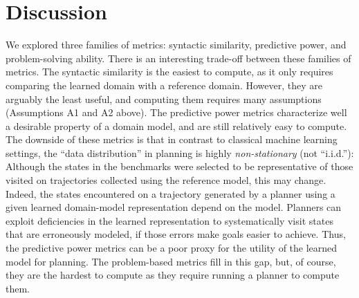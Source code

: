 \documentclass[letterpaper]{article} %
\newif\ifaddcomments
\newcommand{\roni}[1]{\ifaddcomments{\textcolor{red}{[Roni: #1]}}\fi}
\begin{document}
\section{Discussion}
We explored three families of metrics: syntactic similarity, predictive power, and problem-solving ability. 
There is an interesting trade-off between these families of metrics. 
The syntactic similarity is the easiest to compute, as it only requires comparing the learned domain with a reference domain. However, they are arguably the least useful, and computing them requires many assumptions (Assumptions A1 and A2 above). 
The predictive power metrics characterize well a desirable property of a domain model, and are still relatively easy to compute. 
The downside of these metrics is that in contrast to classical machine learning settings, the ``data distribution'' in planning is highly \emph{non-stationary} (not ``i.i.d.''):  Although the states in the benchmarks were selected to be representative of those visited on trajectories collected using the reference model, this may change. Indeed, the states encountered on a trajectory generated by a planner using a given learned domain-model representation depend on the model. Planners can exploit deficiencies in the learned representation to systematically visit states that are erroneously modeled, if those errors make goals easier to achieve. Thus, the predictive power metrics can be a poor proxy for the utility of the learned model for planning. The problem-based metrics fill in this gap, but, of course, they are the hardest to compute as they require running a planner to compute them. 





\end{document}
